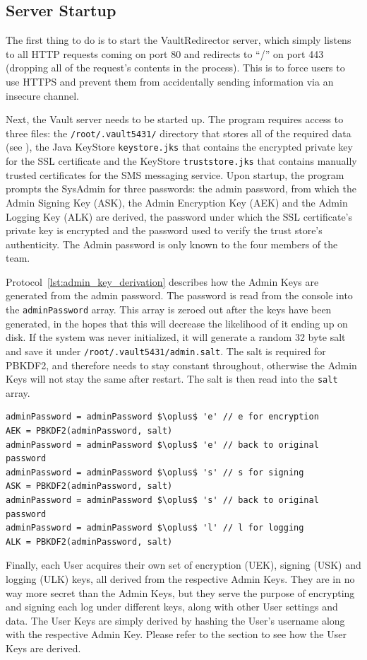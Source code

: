 \documentclass{article}
\begin{document}
\subsection{Server Startup}
\label{sub:server_startup}
\par The first thing to do is to start the VaultRedirector server, which simply listens to all HTTP requests coming on port 80 and redirects to ``/'' on port 443 (dropping all of the request's contents in the process). This is to force users to use HTTPS and prevent them from accidentally sending information via an insecure channel.
\par Next, the Vault server needs to be started up. The program requires access to three files: the \texttt{/root/.vault5431/} directory that stores all of the required data (see ), the Java KeyStore \texttt{keystore.jks} that contains the encrypted private key for the SSL certificate and the KeyStore \texttt{truststore.jks} that contains manually trusted certificates for the SMS messaging service. Upon startup, the program prompts the SysAdmin for three passwords: the admin password, from which the Admin Signing Key (ASK), the Admin Encryption Key (AEK) and the Admin Logging Key (ALK) are derived, the password under which the SSL certificate's private key is encrypted and the password used to verify the trust store's authenticity. The Admin password is only known to the four members of the team.
\par Protocol~\ref{lst:admin_key_derivation} describes how the Admin Keys are generated from the admin password. The password is read from the console into the \texttt{adminPassword} array. This array is zeroed out after the keys have been generated, in the hopes that this will decrease the likelihood of it ending up on disk. If the system was never initialized, it will generate a random 32 byte salt and save it under \texttt{/root/.vault5431/admin.salt}. The salt is required for PBKDF2, and therefore needs to stay constant throughout, otherwise the Admin Keys will not stay the same after restart. The salt is then read into the \texttt{salt} array.
\begin{lstlisting}[caption={Admin Key Derivation},label={lst:admin_key_derivation},style=Pseudocode]
adminPassword = adminPassword $\oplus$ 'e' // e for encryption
AEK = PBKDF2(adminPassword, salt)
adminPassword = adminPassword $\oplus$ 'e' // back to original password
adminPassword = adminPassword $\oplus$ 's' // s for signing
ASK = PBKDF2(adminPassword, salt)
adminPassword = adminPassword $\oplus$ 's' // back to original password
adminPassword = adminPassword $\oplus$ 'l' // l for logging
ALK = PBKDF2(adminPassword, salt)
\end{lstlisting}
\par Finally, each User acquires their own set of encryption (UEK), signing (USK) and logging (ULK) keys, all derived from the respective Admin Keys. They are in no way more secret than the Admin Keys, but they serve the purpose of encrypting and signing each log under different keys, along with other User settings and data. The User Keys are simply derived by hashing the User's username along with the respective Admin Key. Please refer to the  section to see how the User Keys are derived.
\end{document}
